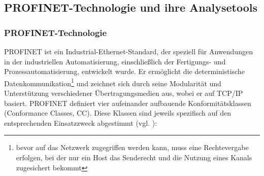 \subsection{PROFINET-Technologie und ihre Analysetools}
\subsubsection{PROFINET-Technologie}

PROFINET ist ein Industrial-Ethernet-Standard, der speziell für Anwendungen in der industriellen Automatisierung, einschließlich der Fertigungs- und Prozessautomatisierung, entwickelt wurde. Er ermöglicht die deterministische Datenkommunikation\footnote{bevor auf das Netzwerk zugegriffen werden kann, muss eine Rechtevergabe erfolgen, bei der nur ein Host das Senderecht und die Nutzung eines Kanals zugesichert bekommt} und zeichnet sich durch seine Modularität und Unterstützung verschiedener Übertragungsmedien aus, wobei er auf TCP/IP basiert. PROFINET definiert vier aufeinander aufbauende Konformitätsklassen (Conformance Classes, CC). Diese Klassen sind jeweils spezifisch auf den entsprechenden Einsatzzweck abgestimmt (vgl. \cite{IPInsider}):

